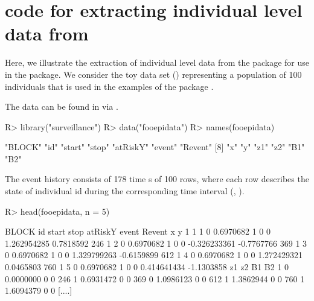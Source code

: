 \documentclass[nojss,shortnames]{jss}
\begin{document}
\newpage
\section[B.]{ code for extracting individual level data from }\label{appendix.1}

Here, we illustrate the extraction of individual level data from the  package for use in the  package. We consider the toy data set () representing a population of 100 individuals that is used in the  examples of the  package \citep{surveillance}.
 
The data can be found in  via .  
\begin{Sinput}
R> library("surveillance")
R> data("fooepidata")
R> names(fooepidata)
\end{Sinput}
\begin{Soutput}
 [1] "BLOCK"   "id"      "start"   "stop"    "atRiskY" "event"   "Revent" 
 [8] "x"       "y"       "z1"      "z2"      "B1"      "B2"     
\end{Soutput}
The  event history consists of 178 time s of 100 rows, where each row describes the state of individual id during the corresponding time interval (, ).
\begin{Sinput}
R> head(fooepidata, n = 5)
\end{Sinput}
\begin{Soutput}
     BLOCK id start      stop atRiskY event Revent            x          y
1        1  1     0 0.6970682       1     0      0  1.262954285  0.7818592
246      1  2     0 0.6970682       1     0      0 -0.326233361 -0.7767766
369      1  3     0 0.6970682       1     0      0  1.329799263 -0.6159899
612      1  4     0 0.6970682       1     0      0  1.272429321  0.0465803
760      1  5     0 0.6970682       1     0      0  0.414641434 -1.1303858
     z1        z2 B1 B2
1     0 0.0000000  0  0
246   1 0.6931472  0  0
369   0 1.0986123  0  0
612   1 1.3862944  0  0
760   1 1.6094379  0  0
[....]
\end{Soutput}
\end{document}
